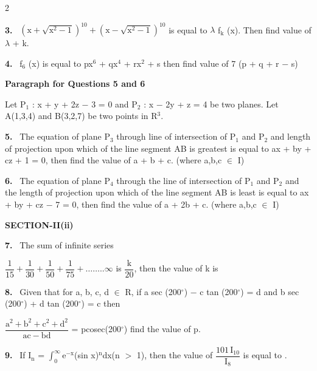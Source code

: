 \documentclass[10pt]{extarticle}
\newcommand{\sect}[1]{\par\smallskip\noindent\textbf{#1}\par}
\newcommand{\qn}[1]{\par\smallskip\noindent\textbf{#1.}~}
\newcommand{\paraq}[2]{\par\smallskip\noindent\textbf{Paragraph for Questions #1 and #2}\par}
\begin{document}
\begin{multicols}{2}
\qn{3} $\left(\mathrm x+\sqrt{\mathrm x^2-1}\right)^{10}+\left(\mathrm x-\sqrt{\mathrm x^2-1}\right)^{10}$ is equal to $\lambda$ f$_\mathrm k$ (x). Then find value of $\lambda$ + k.
\qn{4} f$_6$ (x) is equal to px$^6$ + qx$^4$ + rx$^2$ + s then find value of 7 (p + q + r $-$ s)
\paraq{5}{6}
Let P$_1$ : x + y + 2z $-$ 3 = 0 and P$_2$ : x $-$ 2y + z = 4 be two planes. Let A(1,3,4) and B(3,2,7) be two points in R$^3$.
\qn{5} The equation of plane P$_3$ through line of intersection of P$_1$ and P$_2$ and length of projection upon which of the line segment AB is greatest is equal to ax + by + cz + 1 = 0, then find the value of a + b + c. (where a,b,c $\in$ I)
\qn{6} The equation of plane P$_4$ through the line of intersection of P$_1$ and P$_2$ and the length of projection upon which of the line segment AB is least is equal to ax + by + cz $-$ 7 = 0, then find the value of a + 2b + c. (where a,b,c $\in$ I)
\sect{SECTION-II(ii)}
\qn{7} The sum of infinite series\par
$\dfrac1{15}+\dfrac1{30}+\dfrac1{50}+\dfrac1{75}+\ldots\ldots..\infty$ is $\dfrac{\mathrm k}{20}$, then the value of k is
\qn{8} Given that for a, b, c, d $\in$ R, if a sec (200$^\circ$) $-$ c tan (200$^\circ$) = d and b sec (200$^\circ$) + d tan (200$^\circ$) = c then\par
$\dfrac{\mathrm a^2+\mathrm b^2+\mathrm c^2+\mathrm d^2}{\mathrm{ac}-\mathrm{bd}}$ = pcosec(200$^\circ$) find the value of p\underline{\hspace{1.2cm}}.
\qn{9} If I$_\mathrm n$ = $\displaystyle\int_0^\infty$e$^{-\mathrm x}$(sin x)$^\mathrm n$dx(n $>$ 1), then the value of $\dfrac{101\,\mathrm I_{10}}{\mathrm I_8}$ is equal to \underline{\hspace{2cm}}.
\end{multicols}
\end{document}
